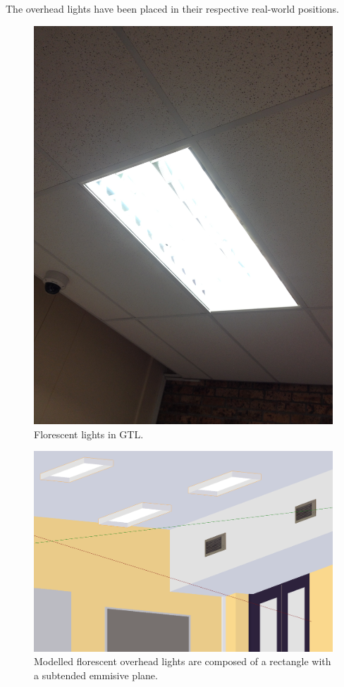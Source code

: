 \documentclass[11pt,a4paper]{report}
\begin{document}
					The overhead lights have been placed in their respective real-world positions.
					\begin{figure}[H]
						\centering
						\includegraphics[width=1\textwidth]{actual_lights}
						\caption[Florescent lights in GTL]{Florescent lights in GTL.}
						\label{fig:actual_lights}
					\end{figure}
					\begin{figure}[H]
						\centering
						\includegraphics[width=1\textwidth]{model_lighting}
						\caption[Modelled florescent lights]{Modelled florescent overhead lights are composed of a rectangle with a subtended emmisive plane.}
						\label{fig:model_lighting}
					\end{figure}
				
\end{document}
